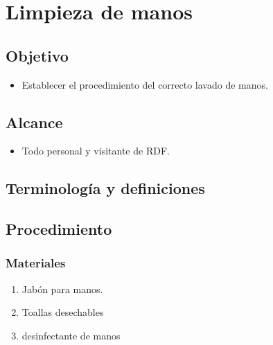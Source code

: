 \thispagestyle{formato-PI}
\renewcommand{\MenorVer}{0}
\renewcommand{\MayorVer}{2}
\renewcommand{\Codigo}{HYS-20-IT}
\renewcommand{\FechaPub}{2023--01}
\renewcommand{\Titulo}{Limpieza de manos}

\section{\Titulo}

\subsection{Objetivo}
\begin{itemize}
	\item Establecer el procedimiento del correcto lavado de manos.
\end{itemize}

\subsection{Alcance}
\begin{itemize}
	\item Todo personal y visitante de \gls{RDF}.
\end{itemize}

\subsection{Terminología y definiciones}
\begin{description}
\end{description}

\subsection{Procedimiento}
\subsubsection{Materiales}
\begin{enumerate}
	\item Jabón para manos.
	\item Toallas desechables
	\item desinfectante de manos
\end{enumerate}

